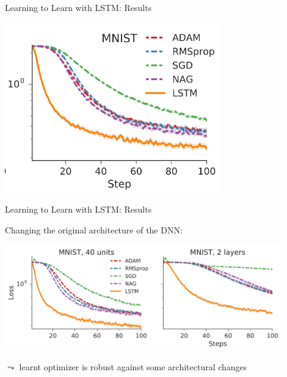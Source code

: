 \begin{frame}[c]{Learning to Learn with LSTM: Results\newline {}}

\centering
\includegraphics[width=0.7\textwidth]{images/l2l_mnist_base}

\end{frame}
\begin{frame}[c]{Learning to Learn with LSTM: Results\newline {}}

Changing the original architecture of the DNN:
\smallskip

\centering
\includegraphics[width=0.9\textwidth]{images/l2l_mnist_okchange}

$\leadsto$ learnt optimizer is robust against some architectural changes

\end{frame}
